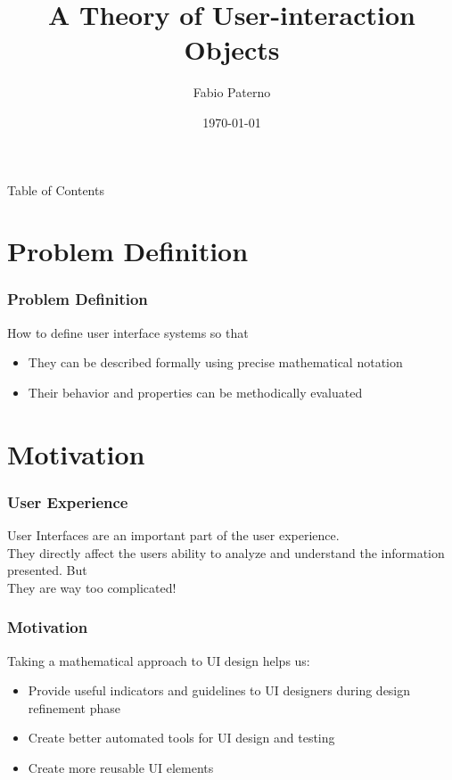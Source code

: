 \documentclass{beamer}
\author[F.Paterno]{Fabio Paterno}
\title[A Theory of User-interaction Objects
]{A Theory of User-interaction Objects}
\institute[CNUCE]{Centro Nazionale Universitario di Calcolo Elettronico, Institute of CNR}
\date{\today}
\begin{document}
\maketitle

\begin{frame}{Table of Contents}
    \tableofcontents
\end{frame}

\section{Problem Definition}
\begin{frame}
\frametitle{Problem Definition}	
How to define user interface systems so that  
\begin{itemize}
	\item They can be described formally using precise mathematical notation 
	\item Their behavior and properties can be methodically evaluated
\end{itemize}
\end{frame}

\section{Motivation}
\begin{frame}
\frametitle{User Experience}
User Interfaces are an important part of the user experience. \\
They directly affect the users ability to analyze and understand the information presented. \newline \newline
But  \newline
\\They are way too complicated!
\end{frame}

\begin{frame}
\frametitle{Motivation}
Taking a mathematical approach to UI design helps us: \\
\begin{itemize}
	\item Provide useful indicators and guidelines to UI designers during design refinement phase\pause
	\item Create better automated tools for UI design and testing \pause
	\item Create more reusable UI elements
\end{itemize}
\end{frame}
\end{document}
